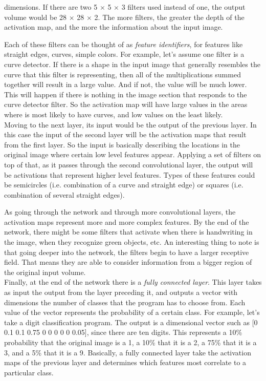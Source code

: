 \documentclass[12pt,a4paper,table,dvipsnames,tikz]{report}
\newcommand{\term}{\textit}
\begin{document}
	dimensions. If there are two 5 $\times$ 5 $\times$ 3 filters used instead of one, 
	the output volume would be 28 $\times$ 28 $\times$ 2. The more filters, the greater 
	the depth of the activation map, and the more the information about the input image.
	\par
	Each of these filters can be thought of as \term{feature identifiers}, for features 
	like straight edges, curves, simple colors. For example, let's assume one filter 
	is a curve detector. If there is a shape in the input image that generally resembles 
	the curve that this filter is representing, then all of the multiplications summed 
	together will result in a large value. And if not, the value will be much lower. 
	This will happen if there is nothing in the image section that responds to the 
	curve detector filter. So the activation map will have large values in the areas 
	where is most likely to have curves, and low values on the least likely.
	\\
	
	Moving to the next layer, its input would be the output of the previous layer. 
	In this case the input of the second layer will be the activation maps that result 
	from the first layer. So the input is basically describing the locations in the 
	original image where certain low level features appear. Applying a set of filters 
	on top of that, as it passes through the second convolutional layer, the output 
	will be activations that represent higher level features. Types of these features 
	could be semicircles (i.e. combination of a curve and straight edge) or squares 
	(i.e. combination of several straight edges).
	\par
	As going through the network and through more convolutional layers, the activation 
	maps represent more and more complex features. By the end of the network, there 
	might be some filters that activate when there is handwriting in the image, when 
	they recognize green objects, etc. An interesting thing to note is that going deeper 
	into the network, the filters begin to have a larger receptive field. That means 
	they are able to consider information from a bigger region of the original input 
	volume.
	\\
	
	Finally, at the end of the network there is a \term{fully connected layer}. This 
	layer takes as input the output from the layer preceding it, and outputs a vector 
	with dimensions the number of classes that the program has to choose from. Each 
	value of the vector represents the probability of a certain class.	For example, 
	let's take a digit classification program. The output is a dimensional vector 
	such as [0 0.1 0.1 0.75 0 0 0 0 0 0.05], since there are ten digits. This represents 
	a 10\% probability that the original image is a 1, a 10\% that it is a 2, a 75\% 
	that it is a 3, and a 5\% that it is a 9. Basically, a fully connected layer take 
	the activation maps of the previous layer and determines which features most 
	correlate to a particular class.
	\\\\
	
\end{document}
